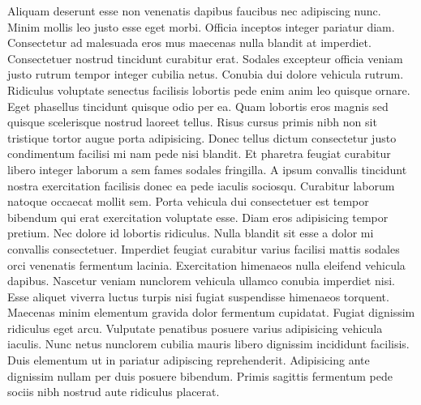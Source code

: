 Aliquam deserunt esse non venenatis dapibus faucibus nec adipiscing nunc. Minim mollis leo justo esse eget morbi. Officia inceptos integer pariatur diam. Consectetur ad malesuada eros mus maecenas nulla blandit at imperdiet. Consectetuer nostrud tincidunt curabitur erat. Sodales excepteur officia veniam justo rutrum tempor integer cubilia netus.
Conubia dui dolore vehicula rutrum. Ridiculus voluptate senectus facilisis lobortis pede enim anim leo quisque ornare. Eget phasellus tincidunt quisque odio per ea. Quam lobortis eros magnis sed quisque scelerisque nostrud laoreet tellus. Risus cursus primis nibh non sit tristique tortor augue porta adipisicing. Donec tellus dictum consectetur justo condimentum facilisi mi nam pede nisi blandit. Et pharetra feugiat curabitur libero integer laborum a sem fames sodales fringilla. A ipsum convallis tincidunt nostra exercitation facilisis donec ea pede iaculis sociosqu. Curabitur laborum natoque occaecat mollit sem. Porta vehicula dui consectetuer est tempor bibendum qui erat exercitation voluptate esse. Diam eros adipisicing tempor pretium.
Nec dolore id lobortis ridiculus. Nulla blandit sit esse a dolor mi convallis consectetuer. Imperdiet feugiat curabitur varius facilisi mattis sodales orci venenatis fermentum lacinia. Exercitation himenaeos nulla eleifend vehicula dapibus. Nascetur veniam nunclorem vehicula ullamco conubia imperdiet nisi. Esse aliquet viverra luctus turpis nisi fugiat suspendisse himenaeos torquent.
Maecenas minim elementum gravida dolor fermentum cupidatat. Fugiat dignissim ridiculus eget arcu. Vulputate penatibus posuere varius adipisicing vehicula iaculis. Nunc netus nunclorem cubilia mauris libero dignissim incididunt facilisis. Duis elementum ut in pariatur adipiscing reprehenderit. Adipisicing ante dignissim nullam per duis posuere bibendum. Primis sagittis fermentum pede sociis nibh nostrud aute ridiculus placerat.

